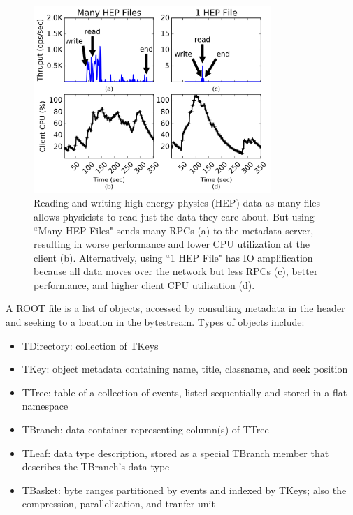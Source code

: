\begin{figure}[t]
  \centering
  \includegraphics[width=90mm]{figures/hep_problem.png}
  \caption{Reading and writing high-energy physics (HEP) data as many files
allows physicists to read just the data they care about. But using ``Many HEP
Files" sends many RPCs (a) to the metadata server, resulting in worse
performance and lower CPU utilization at the client (b). Alternatively, using
``1 HEP File" has IO amplification because all data moves over the network but
less RPCs (c), better performance, and higher client CPU utilization (d).}
  \label{fig:hep_problem}
\end{figure}



A ROOT file is a list of objects, accessed by consulting metadata in the
header and seeking to a location in the bytestream. Types of objects include: 

\begin{itemize}

  \item TDirectory: collection of TKeys

  \item TKey: object metadata containing name, title, classname, and seek
  position

  \item TTree: table of a collection of events, listed sequentially and stored in a flat namespace

  \item TBranch: data container representing column(s) of TTree

  \item TLeaf: data type description, stored as a special TBranch member
  that describes the TBranch's data type

  \item TBasket: byte ranges partitioned by events and indexed by TKeys;
  also the compression, parallelization, and tranfer unit

\end{itemize}

